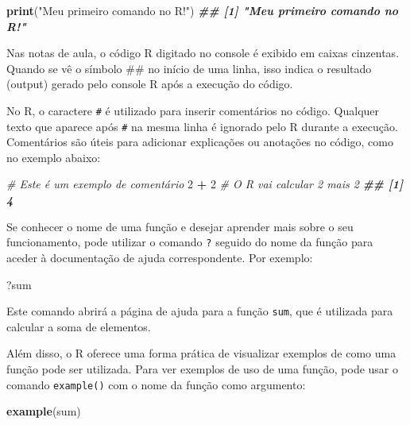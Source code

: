 \documentclass[
]{book}
\newenvironment{Shaded}{\begin{snugshade}}{\end{snugshade}}
\newcommand{\CommentTok}[1]{\textcolor[rgb]{0.56,0.35,0.01}{\textit{#1}}}
\newcommand{\DecValTok}[1]{\textcolor[rgb]{0.00,0.00,0.81}{#1}}
\newcommand{\DocumentationTok}[1]{\textcolor[rgb]{0.56,0.35,0.01}{\textbf{\textit{#1}}}}
\newcommand{\FunctionTok}[1]{\textcolor[rgb]{0.13,0.29,0.53}{\textbf{#1}}}
\newcommand{\NormalTok}[1]{#1}
\newcommand{\SpecialCharTok}[1]{\textcolor[rgb]{0.81,0.36,0.00}{\textbf{#1}}}
\newcommand{\StringTok}[1]{\textcolor[rgb]{0.31,0.60,0.02}{#1}}
\begin{document}
\begin{Shaded}
\begin{Highlighting}[]
\FunctionTok{print}\NormalTok{(}\StringTok{"Meu primeiro comando no R!"}\NormalTok{)}
\DocumentationTok{\#\# [1] "Meu primeiro comando no R!"}
\end{Highlighting}
\end{Shaded}

Nas notas de aula, o código R digitado no console é exibido em caixas
cinzentas. Quando se vê o símbolo \#\# no início de uma linha, isso
indica o resultado (output) gerado pelo console R após a execução do
código.

No R, o caractere \texttt{\#} é utilizado para inserir comentários no código.
Qualquer texto que aparece após \texttt{\#} na mesma linha é ignorado pelo R
durante a execução. Comentários são úteis para adicionar explicações ou
anotações no código, como no exemplo abaixo:

\begin{Shaded}
\begin{Highlighting}[]
\CommentTok{\# Este é um exemplo de comentário}
\DecValTok{2} \SpecialCharTok{+} \DecValTok{2} \CommentTok{\# O R vai calcular 2 mais 2}
\DocumentationTok{\#\# [1] 4}
\end{Highlighting}
\end{Shaded}

Se conhecer o nome de uma função e desejar aprender mais sobre o seu
funcionamento, pode utilizar o comando \texttt{?} seguido do nome da função
para aceder à documentação de ajuda correspondente. Por exemplo:

\begin{Shaded}
\begin{Highlighting}[]
\NormalTok{?sum}
\end{Highlighting}
\end{Shaded}

Este comando abrirá a página de ajuda para a função \texttt{sum}, que é
utilizada para calcular a soma de elementos.

Além disso, o R oferece uma forma prática de visualizar exemplos de como
uma função pode ser utilizada. Para ver exemplos de uso de uma função,
pode usar o comando \texttt{example()} com o nome da função como argumento:

\begin{Shaded}
\begin{Highlighting}[]
\FunctionTok{example}\NormalTok{(sum)}
\end{Highlighting}
\end{Shaded}
\end{document}
